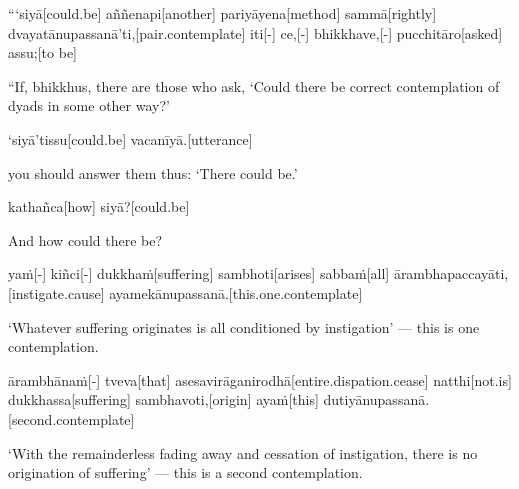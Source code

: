 \begin{samepage}
\begingl[glneveryline={\PaliGlossA,\PaliGlossB}]
“‘siyā[could.be] aññenapi[another] pariyāyena[method] sammā[rightly] dvayatānupassanā’ti,[pair.contemplate] iti[-] ce,[-] bhikkhave,[-] pucchitāro[asked] assu;[to be]
\endgl
\nopagebreak
\linespread{0.5}
\begin{spacin}{0.2}
{\PaliGlossFT “If, bhikkhus, there are those who ask, ‘Could there be correct contemplation of dyads in some other way?’}
\end{spacin}
\vskip 12pt
\end{samepage}
\begin{samepage}
\begingl[glneveryline={\PaliGlossA,\PaliGlossB}]
‘siyā’tissu[could.be] vacanīyā.[utterance]
\endgl
\nopagebreak
\linespread{0.5}
\begin{spacin}{0.2}
{\PaliGlossFT you should answer them thus: ‘There could be.’}
\end{spacin}
\vskip 12pt
\end{samepage}
\begin{samepage}
\begingl[glneveryline={\PaliGlossA,\PaliGlossB}]
kathañca[how] siyā?[could.be]
\endgl
\nopagebreak
\linespread{0.5}
\begin{spacin}{0.2}
{\PaliGlossFT And how could there be?}
\end{spacin}
\vskip 12pt
\end{samepage}
\begin{samepage}
\begingl[glneveryline={\PaliGlossA,\PaliGlossB}]
yaṁ[-] kiñci[-] dukkhaṁ[suffering] sambhoti[arises] sabbaṁ[all] ārambhapaccayāti,[instigate.cause] ayamekānupassanā.[this.one.contemplate]
\endgl
\nopagebreak
\linespread{0.5}
\begin{spacin}{0.2}
{\PaliGlossFT ‘Whatever suffering originates is all conditioned by instigation’ — ­this is one contemplation.}
\end{spacin}
\vskip 12pt
\end{samepage}
\begin{samepage}
\begingl[glneveryline={\PaliGlossA,\PaliGlossB}]
ārambhānaṁ[-] tveva[that] asesavirāganirodhā[entire.dispation.cease] natthi[not.is] dukkhassa[suffering] sambhavoti,[origin] ayaṁ[this] dutiyānupassanā.[second.contemplate]
\endgl
\nopagebreak
\linespread{0.5}
\begin{spacin}{0.2}
{\PaliGlossFT ‘With the remainderless fading away and cessation of instigation, there is no origination of suffering’ — this is a second contemplation.}
\end{spacin}
\vskip 12pt
\end{samepage}
